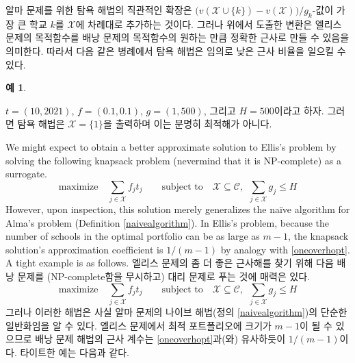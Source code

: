 \documentclass[11pt]{article} %
\newif\ifen
\theoremstyle{definition}
\newtheorem{example}{Example}
\theoremstyle{definition}
\newtheorem{example}{예}
\begin{document}
\ifen 
An intuitive extension of the greedy algorithm for Alma's problem is to iteratively add to $\mathcal{X}$ the school $k$ for which $\bigl( v(\mathcal{X}\cup\{k\}) - v(\mathcal{X}) \bigr) / g_k$ is largest. But the construction above shows that the objective function of Ellis's problem can approximate that of a knapsack problem with arbitrary precision. Therefore, in pathological examples such as the following, the greedy algorithm can achieve an arbitrarily small approximation ratio. 
\else
알마 문제를 위한 탐욕 해법의 직관적인 확장은 $\bigl( v(\mathcal{X}\cup\{k\}) - v(\mathcal{X}) \bigr) / g_k$-값이 가장 큰 학교 $k$를  $\mathcal{X}$에 차례대로 추가하는 것이다. 그러나 위에서 도출한 변환은 엘리스 문제의 목적함수를 배낭 문제의 목적함수의 원하는 만큼 정확한 근사로 만들 수 있음을 의미한다. 따라서 다음 같은 병례에서 탐욕 해법은 임의로 낮은 근사 비율을 일으킬 수 있다.
\fi
\begin{example} \label{greedyzeroellis}
\ifen
Let $t = (10, 2021)$, $f = (0.1, 0.1)$, $g = (1, 500)$, and $H = 500$. Then the greedy approximation algorithm produces the clearly inoptimal solution $\mathcal{X} = \{1\}$. 
\else
 $t = (10, 2021)$, $f = (0.1, 0.1)$, $g = (1, 500)$, 그리고 $H = 500$이라고 하자. 그러면 탐욕 해법은 $\mathcal{X} = \{1\}$을 출력하며 이는 분명히 최적해가 아니다.
\fi
\end{example} 
\ifen
We might expect to obtain a better approximate solution to Ellis's problem by solving the following knapsack problem (nevermind that it is NP-complete) as a surrogate.
\begin{equation}
\text{maximize}\quad \sum_{j \in \mathcal{X}} f_j t_j \qquad \text{subject to}\quad\mathcal{X}\subseteq\mathcal{C},~~\sum_{j \in \mathcal{X}} g_j \leq H
\end{equation}
However, upon inspection, this solution merely generalizes the na\"ive algorithm for Alma's problem (Definition \ref{naivealgorithm}). In Ellis's problem, because the number of schools in the optimal portfolio can be as large as $m-1$, the knapsack solution's approximation coefficient is $1/(m-1)$ by analogy with \eqref{oneoverhopt}. A tight example is as follows. 
\else
엘리스 문제의 좀 더 좋은 근사해를 찾기 위해 다음 배낭 문제를 (NP-complete함을 무시하고) 대리 문제로 푸는 것에 매력은 있다.
\begin{equation}
\text{maximize}\quad \sum_{j \in \mathcal{X}} f_j t_j \qquad \text{subject to}\quad\mathcal{X}\subseteq\mathcal{C},~~\sum_{j \in \mathcal{X}} g_j \leq H
\end{equation}
그러나 이러한 해법은 사실 알마 문제의 나이브 해법(정의 \ref{naivealgorithm})의 단순한 일반화임을 알 수 있다. 엘리스 문제에서 최적 포트폴리오에 크기가 $m-1$이 될 수 있으므로 배낭 문제 해법의 근사 계수는 \eqref{oneoverhopt}과(와) 유사하듯이 $1 / (m-1)$이다. 타이트한 예는 다음과 같다.
\end{document}
